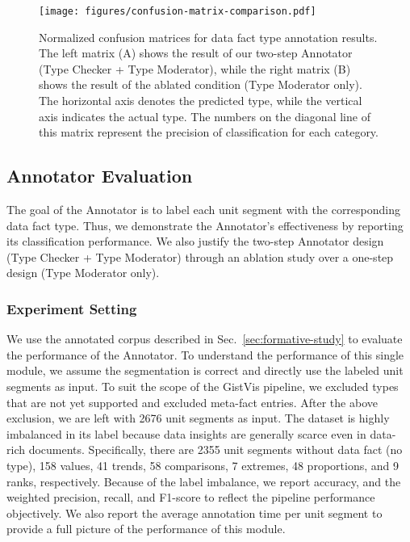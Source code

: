 \begin{figure*}[tbp]
    \centering
    \texttt{[image: figures/confusion-matrix-comparison.pdf]}
    \caption{Normalized confusion matrices for data fact type annotation results. The left matrix (A) shows the result of our two-step Annotator (Type Checker + Type Moderator), while the right matrix (B) shows the result of the ablated condition (Type Moderator only). The horizontal axis denotes the predicted type, while the vertical axis indicates the actual type. The numbers on the diagonal line of this matrix represent the precision of classification for each category.}
    \label{fig:type-confusion-mat}
\end{figure*}


\subsection{Annotator Evaluation}
\label{subsec:quant-eval-annotator}

The goal of the Annotator is to label each unit segment with the corresponding data fact type. Thus, we demonstrate the Annotator's effectiveness by reporting its classification performance. We also justify the two-step Annotator design (Type Checker + Type Moderator) through an ablation study over a one-step design (Type Moderator only).

\subsubsection{Experiment Setting}
We use the annotated corpus described in Sec.~\ref{sec:formative-study} to evaluate the performance of the Annotator. To understand the performance of this single module, we assume the segmentation is correct and directly use the labeled unit segments as input. To suit the scope of the GistVis pipeline, we excluded types that are not yet supported and excluded meta-fact entries. After the above exclusion, we are left with 2676 unit segments as input. The dataset is highly imbalanced in its label because data insights are generally scarce even in data-rich documents. Specifically, there are 2355 unit segments without data fact (no type), 158 values, 41 trends, 58 comparisons, 7 extremes, 48 proportions, and 9 ranks, respectively. Because of the label imbalance, we report accuracy, and the weighted precision, recall, and F1-score to reflect the pipeline performance objectively. We also report the average annotation time per unit segment to provide a full picture of the performance of this module.

